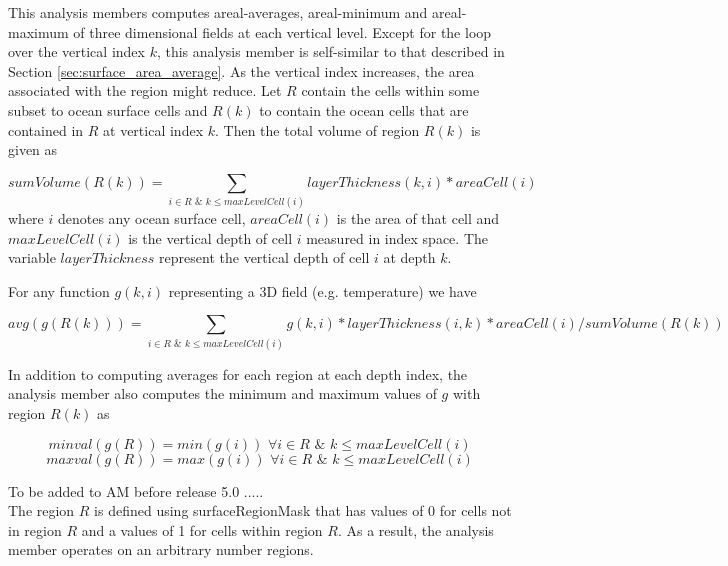 This analysis members computes areal-averages, areal-minimum and areal-maximum of three dimensional fields at each vertical level. Except for the loop over the vertical index $k$, this analysis member is self-similar to that described in Section \ref{sec:surface_area_average}. As the vertical index increases, the area associated with the region might reduce. Let $R$ contain the cells within some subset to ocean surface cells and $R(k)$ to contain the ocean cells that are contained in $R$ at vertical index $k$. Then the total volume of region $R(k)$ is given as

\begin{equation}
sumVolume(R(k)) = \sum_{i \in R \,\, \& \,\, k \le maxLevelCell(i)} layerThickness(k,i) * areaCell(i)
\end{equation}
where $i$ denotes any ocean surface cell, $areaCell(i)$ is the area of that cell and $maxLevelCell(i)$ is the vertical depth of cell $i$ measured in index space. The variable $layerThickness$ represent the vertical depth of cell $i$ at depth $k$.

For any function $g(k,i)$ representing a 3D field (e.g. temperature) we have

\begin{equation}
avg(g(R(k))) = \sum_{i \in R \,\, \& \,\, k \le maxLevelCell(i)} g(k,i)*layerThickness(i,k)*areaCell(i) / sumVolume(R(k))
\end{equation}

In addition to computing averages for each region at each depth index, the analysis member also computes the minimum and maximum values of $g$ with region $R(k)$ as

\begin{equation}
minval(g(R))=min(g(i)) \, \, \forall i \in R \,\, \& \,\, k \le maxLevelCell(i)
\end{equation}
\begin{equation}
maxval(g(R))=max(g(i)) \, \, \forall i \in R \,\, \& \,\, k \le maxLevelCell(i)
\end{equation}

{\noindent}To be added to AM before release 5.0 .....\\
The region $R$ is defined using surfaceRegionMask that has values of 0 for cells not in region $R$ and a values of 1 for cells within region $R$. As a result, the analysis member operates on an arbitrary number regions.
